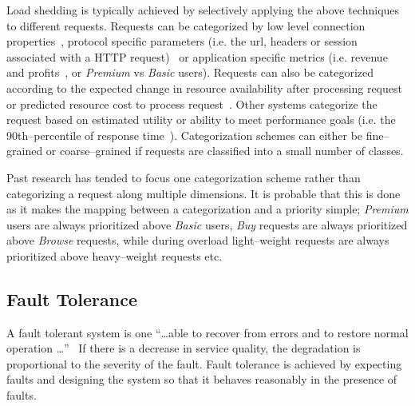 \documentclass[conference]{IEEEtran}
\begin{document}
Load shedding is typically achieved by selectively applying the above techniques to different requests. Requests can be categorized by low level connection properties~\cite{Voigt:2001qe}, protocol specific parameters (i.e. the url, headers or session associated with a HTTP request)~\cite{Cherkasova:2002yb,Voigt:2001qe} or application specific metrics (i.e. revenue and profits~\cite{Menasec:2000ty}, or \emph{Premium} vs \emph{Basic} users). Requests can also be categorized according to the expected change in resource availability after processing request~\cite{Behren03Capriccio} or predicted resource cost to process request~\cite{Crovella99Alpha}. Other systems categorize the request based on estimated utility\cite{Zhou06RequestAware} or ability to meet performance goals (i.e. the 90th--percentile of response time~\cite{welsh03Adaptive}). Categorization schemes can either be fine--grained or coarse--grained if requests are classified into a small number of classes. 

Past research has tended to focus one categorization scheme rather than categorizing a request along multiple dimensions. It is probable that this is done as it makes the mapping between a categorization and a priority simple; \emph{Premium} users are always prioritized above \emph{Basic} users, \emph{Buy} requests are always prioritized above \emph{Browse} requests, while during overload light--weight requests are always prioritized above heavy--weight requests etc. 

\subsection{Fault Tolerance}


A fault tolerant system is one ``\ldots able to recover from errors and to restore normal operation \ldots''~\cite{Renzel:03:ErrorHandling} If there is a decrease in service quality, the degradation is proportional to the severity of the fault. Fault tolerance is achieved by expecting faults and designing the system so that it behaves reasonably in the presence of faults.
\end{document}
